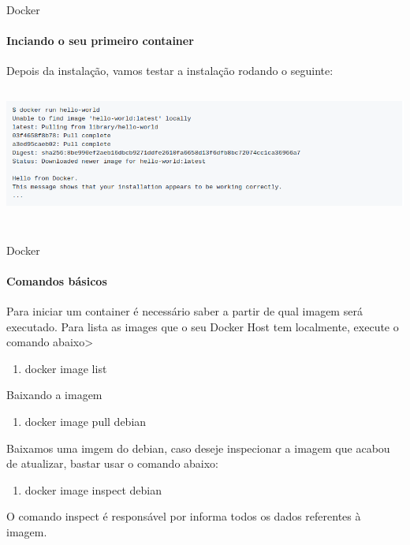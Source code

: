\documentclass{beamer}
\begin{document}
\begin{frame}{Docker}
    \framesubtitle{Inciando o seu primeiro container}
    Depois da instala\c{c}\~ao, vamos testar a instala\c{c}\~ao rodando o seguinte:
    \includegraphics[height=5cm]{img/hello.png}
\end{frame}

\begin{frame}{Docker}
    \framesubtitle{Comandos básicos}
    Para iniciar um container \'e necess\'ario saber a partir de qual imagem será executado. Para lista as
    images que o seu Docker Host tem localmente, execute o comando abaixo>
    \begin{enumerate}
        \item  docker image list
    \end{enumerate}
    Baixando a imagem
    \begin{enumerate}
        \item docker image pull debian
    \end{enumerate}
    Baixamos uma imgem do debian, caso deseje inspecionar a imagem que acabou de atualizar, bastar usar o comando abaixo:
    \begin{enumerate}
        \item docker image inspect debian
    \end{enumerate}
    O comando inspect \'e respons\'avel por informa todos os dados referentes \`a imagem.
\end{frame}
\end{document}

